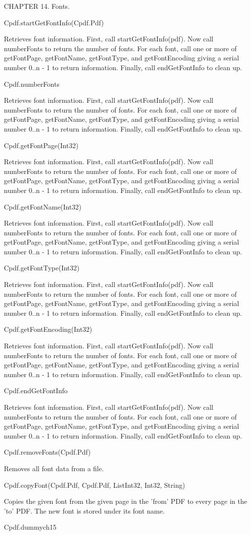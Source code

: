 CHAPTER 14. Fonts.

Cpdf.startGetFontInfo(Cpdf.Pdf)

Retrieves font information. First, call startGetFontInfo(pdf). Now
call numberFonts to return the number of fonts. For each font, call
one or more of getFontPage, getFontName, getFontType, and
getFontEncoding giving a serial number 0..n - 1 to
return information. Finally, call endGetFontInfo to clean up.

Cpdf.numberFonts

Retrieves font information. First, call startGetFontInfo(pdf). Now
call numberFonts to return the number of fonts. For each font, call
one or more of getFontPage, getFontName, getFontType, and
getFontEncoding giving a serial number 0..n - 1 to
return information. Finally, call endGetFontInfo to clean up.

Cpdf.getFontPage(Int32)

Retrieves font information. First, call startGetFontInfo(pdf). Now
call numberFonts to return the number of fonts. For each font, call
one or more of getFontPage, getFontName, getFontType, and
getFontEncoding giving a serial number 0..n - 1 to
return information. Finally, call endGetFontInfo to clean up.

Cpdf.getFontName(Int32)

Retrieves font information. First, call startGetFontInfo(pdf). Now
call numberFonts to return the number of fonts. For each font, call
one or more of getFontPage, getFontName, getFontType, and
getFontEncoding giving a serial number 0..n - 1 to
return information. Finally, call endGetFontInfo to clean up.

Cpdf.getFontType(Int32)

Retrieves font information. First, call startGetFontInfo(pdf). Now
call numberFonts to return the number of fonts. For each font, call
one or more of getFontPage, getFontName, getFontType, and
getFontEncoding giving a serial number 0..n - 1 to
return information. Finally, call endGetFontInfo to clean up.

Cpdf.getFontEncoding(Int32)

Retrieves font information. First, call startGetFontInfo(pdf). Now
call numberFonts to return the number of fonts. For each font, call
one or more of getFontPage, getFontName, getFontType, and
getFontEncoding giving a serial number 0..n - 1 to
return information. Finally, call endGetFontInfo to clean up.

Cpdf.endGetFontInfo

Retrieves font information. First, call startGetFontInfo(pdf). Now
call numberFonts to return the number of fonts. For each font, call
one or more of getFontPage, getFontName, getFontType, and
getFontEncoding giving a serial number 0..n - 1 to
return information. Finally, call endGetFontInfo to clean up.

Cpdf.removeFonts(Cpdf.Pdf)

Removes all font data from a file.

Cpdf.copyFont(Cpdf.Pdf, Cpdf.Pdf, List{Int32}, Int32, String)

Copies the given font
from the given page in the 'from' PDF to every page in the 'to' PDF. The
new font is stored under its font name.

Cpdf.dummych15

